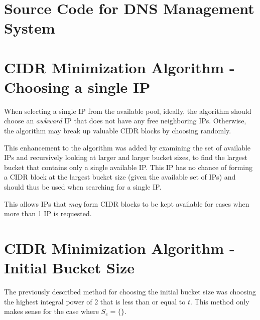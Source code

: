 \begin{appendices}

\chapter{Source Code for DNS Management System}
\label{appendix:dnsManagement}






\chapter{CIDR Minimization Algorithm - Choosing a single IP}
\label{appendix:smartSingleIP}
When selecting a single IP from the available pool, ideally, the algorithm should choose an \textit{awkward} IP that does not have any free neighboring IPs. Otherwise, the algorithm may break up valuable CIDR blocks by choosing randomly. 

This enhancement to the algorithm was added by examining the set of available IPs and recursively looking at larger and larger bucket sizes, to find the largest bucket that contains only a single available IP. This IP has no chance of forming a CIDR block at the largest bucket size (given the available set of IPs) and should thus be used when searching for a single IP. 

This allows IPs that \textit{may} form CIDR blocks to be kept available for cases when more than 1 IP is requested. 


\chapter{CIDR Minimization Algorithm - Initial Bucket Size}
\label{appendix:smartInitBucket}
The previously described method for choosing the initial bucket size was choosing the highest integral power of 2 that is less than or equal to $t$. This method only makes sense for the case where $S_e = \{\}$. 


\end{appendices}
